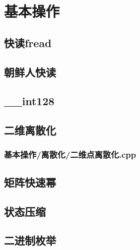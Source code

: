 \documentclass[landscape,twocolumn,twoside,a4paper]{article}
\begin{document}
\small

\newpage
\pagestyle{empty}
\renewcommand{\contentsname}{目录}
\tableofcontents
\newpage\clearpage
\newpage
\pagestyle{fancy}
\setcounter{page}{1}   %

\section{基本操作}

\subsection{快读fread}


\subsection{朝鲜人快读}


\subsection{\_\_int128}


\subsection{二维离散化}
\subsubsection{基本操作/离散化/二维点离散化.cpp}

\subsection{矩阵快速幂}


\subsection{状态压缩}


\subsection{二进制枚举}

\end{document}
